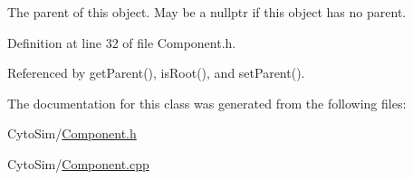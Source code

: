 The parent of this object. May be a nullptr if this object has no parent. 



Definition at line 32 of file Component.\-h.



Referenced by get\-Parent(), is\-Root(), and set\-Parent().



The documentation for this class was generated from the following files\-:\begin{DoxyCompactItemize}
\item 
Cyto\-Sim/\hyperlink{Component_8h}{Component.\-h}\item 
Cyto\-Sim/\hyperlink{Component_8cpp}{Component.\-cpp}\end{DoxyCompactItemize}
